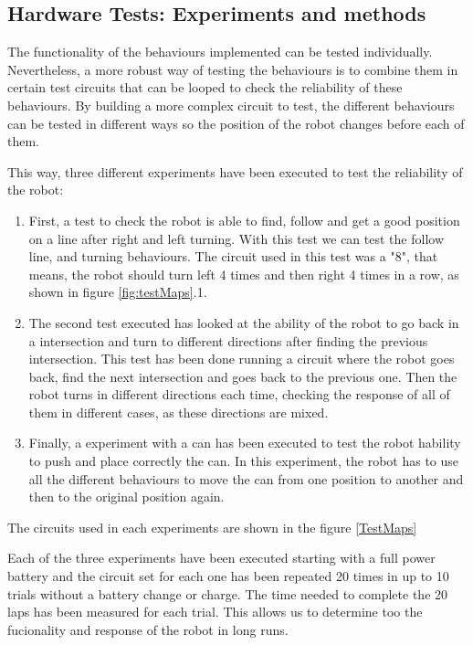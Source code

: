 
\subsection{Hardware Tests: Experiments and methods}

The functionality of the behaviours implemented can be tested individually.
Nevertheless, a more robust way of testing the behaviours is to combine them in certain test circuits that can be looped to check the reliability of these behaviours.
By building a more complex circuit to test, the different behaviours can be tested in different ways so the position of the robot changes before each of them.

This way, three different experiments have been executed to test the reliability of the robot:

\begin{enumerate}
	\item First, a test to check the robot is able to find, follow and get a good position on a line after right and left turning. 
With this test we can test the follow line, and turning behaviours.
The circuit used in this test was a "8", that means, the robot should turn left 4 times and then right 4 times in a row, 
as shown in figure \ref{fig:testMaps}.1.

	\item The second test executed has looked at the ability of the robot to go back in a intersection and turn to different directions after finding the previous intersection.
This test has been done running a circuit where the robot goes back, find the next intersection and goes back to the previous one. 
Then the robot turns in different directions each time, checking the response of all of them in different cases, as these directions are mixed.

	\item Finally, a experiment with a can has been executed to test the robot hability to push and place correctly the can.
In this experiment, the robot has to use all the different behaviours to move the can from one position to another and then to the original position again.

\end{enumerate}

The circuits used in each experiments are shown in the figure \ref{TestMaps}

Each of the three experiments have been executed starting with a full power battery and the circuit set for each one has been repeated 20 times in up to 10 trials without a battery change or charge.
The time needed to complete the 20 laps has been measured for each trial.
This allows us to determine too the fucionality and response of the robot in long runs.

